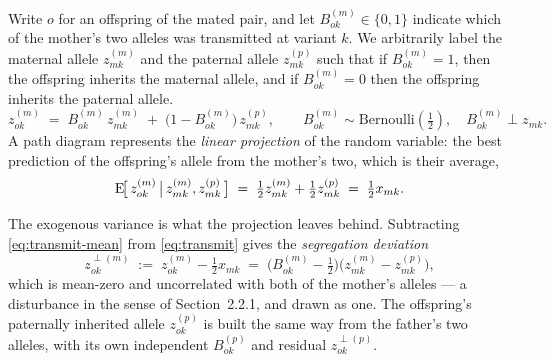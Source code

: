 \documentclass[12pt]{article}
\begin{document}
Write $o$ for an offspring of the mated pair, and let $B^{(m)}_{ok} \in \{0,1\}$ indicate which of the mother's two alleles was transmitted at variant $k$.
We arbitrarily label the maternal allele $z^{(m)}_{mk}$ and the paternal allele $z^{(p)}_{mk}$ such that if $B^{(m)}_{ok} = 1$, then the offspring inherits the maternal allele, and if $B^{(m)}_{ok} = 0$ then the offspring inherits the paternal allele.
\begin{equation}\label{eq:transmit}
    z^{(m)}_{ok} \;=\; B^{(m)}_{ok}\, z^{(m)}_{mk} \;+\; \big(1 - B^{(m)}_{ok}\big)\, z^{(p)}_{mk} ,
    \qquad B^{(m)}_{ok} \sim \mathrm{Bernoulli}(\tfrac12), \quad B^{(m)}_{ok} \perp z_{mk} .
\end{equation}
A path diagram represents the \emph{linear projection} of the random variable: the best prediction of the offspring's allele from the mother's two, which is their average,
\begin{equation}\label{eq:transmit-mean}
    \mathrm{E}\!\big[\,z^{(m)}_{ok} \,\big|\, z^{(m)}_{mk}, z^{(p)}_{mk}\,\big]
    \;=\; \tfrac12 z^{(m)}_{mk} + \tfrac12 z^{(p)}_{mk}
    \;=\; \tfrac12 x_{mk} .
\end{equation}

The exogenous variance is what the projection leaves behind.
Subtracting \eqref{eq:transmit-mean} from \eqref{eq:transmit} gives the \emph{segregation deviation}
\begin{equation}\label{eq:seg-def}
    z^{\perp(m)}_{ok} \;:=\; z^{(m)}_{ok} - \tfrac12 x_{mk} \;=\; \big(B^{(m)}_{ok} - \tfrac12\big)\big(z^{(m)}_{mk} - z^{(p)}_{mk}\big) ,
\end{equation}
which is mean-zero and uncorrelated with both of the mother's alleles --- a disturbance in the sense of Section~2.2.1, and drawn as one.
The offspring's paternally inherited allele $z^{(p)}_{ok}$ is built the same way from the father's two alleles, with its own independent $B^{(p)}_{ok}$ and residual $z^{\perp(p)}_{ok}$.
\end{document}

